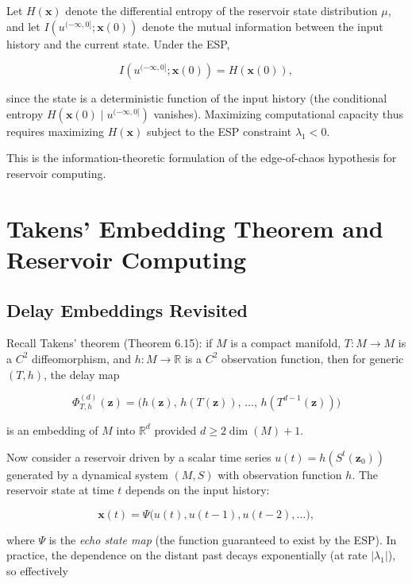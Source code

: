 \begin{proposition}\label{prop:16.8.}
Let $H(\mathbf{x})$ denote the differential entropy of the reservoir state distribution $\mu$, and let $I(u^{(-\infty, 0]}; \mathbf{x}(0))$ denote the mutual information between the input history and the current state. Under the ESP,

\[
I(u^{(-\infty, 0]}; \mathbf{x}(0)) = H(\mathbf{x}(0)),
\]

since the state is a deterministic function of the input history (the conditional entropy $H(\mathbf{x}(0) \mid u^{(-\infty, 0]})$ vanishes). Maximizing computational capacity thus requires maximizing $H(\mathbf{x})$ subject to the ESP constraint $\lambda_1 < 0$.

This is the information-theoretic formulation of the edge-of-chaos hypothesis for reservoir computing.


\bigskip

\end{proposition}


\section{Takens' Embedding Theorem and Reservoir Computing}\label{sec:16.5}

\subsection{Delay Embeddings Revisited}\label{sec:16.5.1}

Recall Takens' theorem (Theorem 6.15): if $M$ is a compact manifold, $T: M \to M$ is a $C^2$ diffeomorphism, and $h: M \to \mathbb{R}$ is a $C^2$ observation function, then for generic $(T, h)$, the delay map

\[
\Phi_{T,h}^{(d)}(\mathbf{z}) = \bigl(h(\mathbf{z}),\, h(T(\mathbf{z})),\, \ldots,\, h(T^{d-1}(\mathbf{z}))\bigr)
\]

is an embedding of $M$ into $\mathbb{R}^d$ provided $d \geq 2\dim(M) + 1$.

Now consider a reservoir driven by a scalar time series $u(t) = h(S^t(\mathbf{z}_0))$ generated by a dynamical system $(M, S)$ with observation function $h$. The reservoir state at time $t$ depends on the input history:

\[
\mathbf{x}(t) = \Psi\bigl(u(t), u(t-1), u(t-2), \ldots\bigr),
\]

where $\Psi$ is the \textit{echo state map} (the function guaranteed to exist by the ESP). In practice, the dependence on the distant past decays exponentially (at rate $|\lambda_1|$), so effectively

